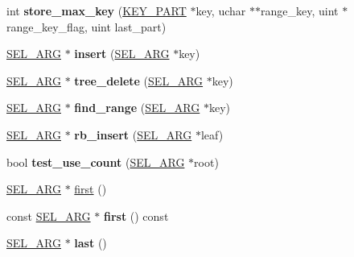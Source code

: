 \begin{DoxyCompactItemize}
\mbox{\label{classSEL__ARG_a26b8239b60bd5e98e9db62cd83a87477}} 
int {\bfseries store\+\_\+max\+\_\+key} (\mbox{\hyperlink{structst__key__part}{K\+E\+Y\+\_\+\+P\+A\+RT}} $\ast$key, uchar $\ast$$\ast$range\+\_\+key, uint $\ast$range\+\_\+key\+\_\+flag, uint last\+\_\+part)
\item 
\mbox{\label{classSEL__ARG_aa89c9380b10e2ff27bf3e4ab037c2397}} 
\mbox{\hyperlink{classSEL__ARG}{S\+E\+L\+\_\+\+A\+RG}} $\ast$ {\bfseries insert} (\mbox{\hyperlink{classSEL__ARG}{S\+E\+L\+\_\+\+A\+RG}} $\ast$key)
\item 
\mbox{\label{classSEL__ARG_ae36c2548f4aacfc0194028384c5c2159}} 
\mbox{\hyperlink{classSEL__ARG}{S\+E\+L\+\_\+\+A\+RG}} $\ast$ {\bfseries tree\+\_\+delete} (\mbox{\hyperlink{classSEL__ARG}{S\+E\+L\+\_\+\+A\+RG}} $\ast$key)
\item 
\mbox{\label{classSEL__ARG_ab805870ac9c6c1ccef9b79ffca3e7e40}} 
\mbox{\hyperlink{classSEL__ARG}{S\+E\+L\+\_\+\+A\+RG}} $\ast$ {\bfseries find\+\_\+range} (\mbox{\hyperlink{classSEL__ARG}{S\+E\+L\+\_\+\+A\+RG}} $\ast$key)
\item 
\mbox{\label{classSEL__ARG_a1a139bc0a27a0baf5085012dd2dd98f5}} 
\mbox{\hyperlink{classSEL__ARG}{S\+E\+L\+\_\+\+A\+RG}} $\ast$ {\bfseries rb\+\_\+insert} (\mbox{\hyperlink{classSEL__ARG}{S\+E\+L\+\_\+\+A\+RG}} $\ast$leaf)
\item 
\mbox{\label{classSEL__ARG_aeb39e9f9c196b30d7efedeb224abb6c1}} 
bool {\bfseries test\+\_\+use\+\_\+count} (\mbox{\hyperlink{classSEL__ARG}{S\+E\+L\+\_\+\+A\+RG}} $\ast$root)
\item 
\mbox{\hyperlink{classSEL__ARG}{S\+E\+L\+\_\+\+A\+RG}} $\ast$ \mbox{\hyperlink{classSEL__ARG_a0a33bd4e8cba61765e62d60577857cb7}{first}} ()
\item 
\mbox{\label{classSEL__ARG_aa3e59511fa3216c39a32ecbed307ad30}} 
const \mbox{\hyperlink{classSEL__ARG}{S\+E\+L\+\_\+\+A\+RG}} $\ast$ {\bfseries first} () const
\item 
\mbox{\label{classSEL__ARG_a17c48c7254ff8bf8028feed7aae775ff}} 
\mbox{\hyperlink{classSEL__ARG}{S\+E\+L\+\_\+\+A\+RG}} $\ast$ {\bfseries last} ()
$$
\end{DoxyCompactItemize}
